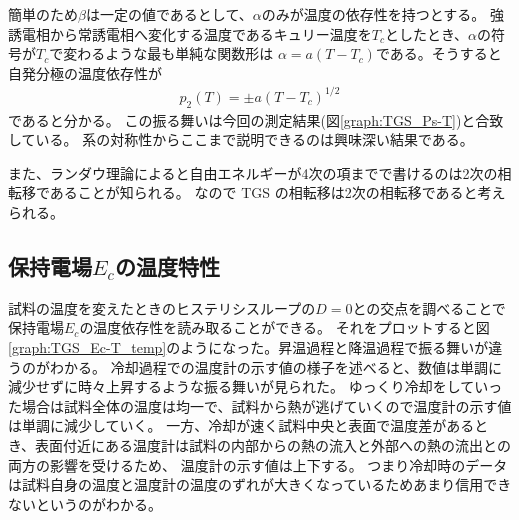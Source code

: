 \documentclass[9pt,dvipdfmx,a4paper]{jsarticle}
\begin{document}
簡単のため\(\beta\)は一定の値であるとして、\(\alpha\)のみが温度の依存性を持つとする。
強誘電相から常誘電相へ変化する温度であるキュリー温度を\(T_c\)としたとき、\(\alpha\)の符号が\(T_c\)で変わるような最も単純な関数形は
\(\alpha = a(T-T_c)\)である。そうすると自発分極の温度依存性が
\begin{align}
    p_2(T) = \pm a(T-T_c)^{1/2}
\end{align}
であると分かる。
この振る舞いは今回の測定結果(図\ref{graph:TGS_Ps-T})と合致している。
系の対称性からここまで説明できるのは興味深い結果である。

また、ランダウ理論によると自由エネルギーが4次の項までで書けるのは2次の相転移であることが知られる。
なので TGS の相転移は2次の相転移であると考えられる。

\subsection{保持電場\(E_c\)の温度特性}
試料の温度を変えたときのヒステリシスループの\(D=0\)との交点を調べることで保持電場\(E_c\)の温度依存性を読み取ることができる。
それをプロットすると図\ref{graph:TGS_Ec-T_temp}のようになった。昇温過程と降温過程で振る舞いが違うのがわかる。
冷却過程での温度計の示す値の様子を述べると、数値は単調に減少せずに時々上昇するような振る舞いが見られた。
ゆっくり冷却をしていった場合は試料全体の温度は均一で、試料から熱が逃げていくので温度計の示す値は単調に減少していく。
一方、冷却が速く試料中央と表面で温度差があるとき、表面付近にある温度計は試料の内部からの熱の流入と外部への熱の流出との両方の影響を受けるため、
温度計の示す値は上下する。
つまり冷却時のデータは試料自身の温度と温度計の温度のずれが大きくなっているためあまり信用できないというのがわかる。
\end{document}
